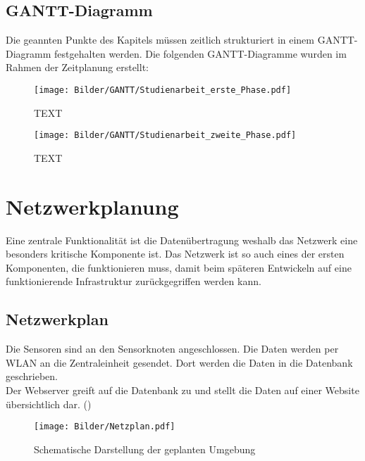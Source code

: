 \subsection{GANTT-Diagramm}
Die geannten Punkte des Kapitels  müssen zeitlich strukturiert in einem GANTT-Diagramm festgehalten werden.
Die folgenden GANTT-Diagramme wurden im Rahmen der Zeitplanung erstellt:
\begin{landscape}
	\begin{figure}[h]
		\texttt{[image: Bilder/GANTT/Studienarbeit\_erste\_Phase.pdf]}
		\caption[CaptionTitle]{TEXT}
		\label{fig:}
	\end{figure}
\end{landscape}
\begin{landscape}
	\begin{figure}[h]
		\texttt{[image: Bilder/GANTT/Studienarbeit\_zweite\_Phase.pdf]}
		\caption[CaptionTitle]{TEXT}
		\label{fig:}
	\end{figure}
\end{landscape}


\section{Netzwerkplanung}
Eine zentrale Funktionalität ist die Datenübertragung weshalb das Netzwerk eine besonders kritische Komponente ist. Das Netzwerk ist so auch eines der ersten Komponenten, die funktionieren muss, damit beim späteren Entwickeln auf eine funktionierende Infrastruktur zurückgegriffen werden kann.
\subsection{Netzwerkplan}
Die Sensoren sind an den Sensorknoten angeschlossen. Die Daten werden per WLAN
an die Zentraleinheit gesendet. Dort werden die Daten in die Datenbank
geschrieben.\\
Der Webserver greift auf die Datenbank zu und stellt die Daten auf einer Website
übersichtlich dar. ()
\begin{figure} [htb]
\begin{centering}
\texttt{[image: Bilder/Netzplan.pdf]}
\caption[Schematische Darstellung der geplanten Umgebung]{Schematische
Darstellung der geplanten Umgebung}
\label{Darstellung_Umgebung}
\end{centering}
\end{figure} 

